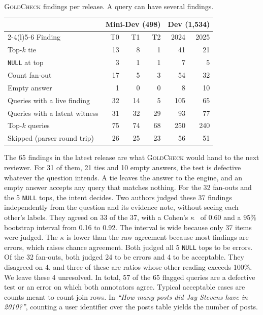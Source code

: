 \documentclass[conference]{IEEEtran}
\newcommand{\sys}{\textsc{GoldCheck}}
\begin{document}
\begin{table}[t]
\caption{\sys{} findings per release. A query can have several findings.}
\label{tab:findings}
\centering
\footnotesize
\setlength{\tabcolsep}{4pt}
\begin{tabular}{@{}lrrrrr@{}}
\toprule
 & \multicolumn{3}{c}{Mini-Dev (498)} & \multicolumn{2}{c}{Dev (1,534)} \\
\cmidrule(lr){2-4}\cmidrule(l){5-6}
Finding & T0 & T1 & T2 & 2024 & 2025 \\
\midrule
Top-$k$ tie & 13 & 8 & 1 & 41 & 21 \\
\texttt{NULL} at top & 3 & 1 & 1 & 7 & 5 \\
Count fan-out & 17 & 5 & 3 & 54 & 32 \\
Empty answer & 1 & 0 & 0 & 8 & 10 \\
\midrule
Queries with a live finding & 32 & 14 & 5 & 105 & 65 \\
Queries with a latent witness & 31 & 32 & 29 & 93 & 77 \\
\midrule
Top-$k$ queries & 75 & 74 & 68 & 250 & 240 \\
Skipped (parser round trip) & 26 & 25 & 23 & 56 & 51 \\
\bottomrule
\end{tabular}
\end{table}

The 65 findings in the latest release are what \sys{} would hand to the next
reviewer. For 31 of them, 21 ties and 10 empty answers, the test is defective
whatever the question intends. A tie leaves the answer to the engine, and an empty answer accepts any query that matches
nothing. For the 32 fan-outs and the 5 \texttt{NULL} tops, the intent decides.
Two authors judged these 37 findings independently from the question and its
evidence note, without seeing each other's labels. They agreed on 33 of the 37,
with a Cohen's $\kappa$~\cite{cohen1960kappa} of 0.60 and a 95\% bootstrap interval from 0.16 to 0.92. The interval is wide because only 37 items were judged. The $\kappa$ is lower than the raw agreement
because most findings are errors, which raises chance agreement. Both judged all
5 \texttt{NULL} tops to be errors. Of the 32 fan-outs, both judged 24 to be
errors and 4 to be acceptable. They disagreed on 4, and three of these are
ratios whose other reading exceeds 100\%. We leave these 4 unresolved.
In total, 57 of the 65 flagged queries are a defective test or an error on which both annotators agree. Typical acceptable cases are counts
meant to count join rows. In \emph{``How many posts did Jay Stevens have in 2010?''}, counting a
user identifier over the posts table yields the number of posts.
\end{document}
